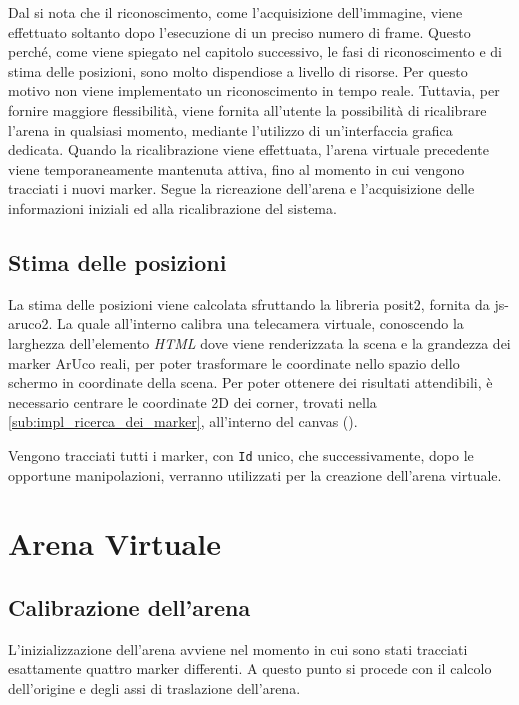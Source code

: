 \documentclass[12pt,a4paper,openright,oneside]{book}
\begin{document}
Dal  si nota che il riconoscimento, come l'acquisizione dell'immagine, viene effettuato soltanto dopo l'esecuzione di un preciso numero di frame. Questo perché, come viene spiegato nel capitolo successivo, le fasi di riconoscimento e di stima delle posizioni, sono molto dispendiose a livello di risorse. Per questo motivo non viene implementato un riconoscimento in tempo reale. Tuttavia, per fornire maggiore flessibilità, viene fornita all'utente la possibilità di ricalibrare l'arena in qualsiasi momento, mediante l'utilizzo di un'interfaccia grafica dedicata. Quando la ricalibrazione viene effettuata, l'arena virtuale precedente viene temporaneamente mantenuta attiva, fino al momento in cui vengono tracciati i nuovi marker. Segue la ricreazione dell'arena e l'acquisizione delle informazioni iniziali ed alla ricalibrazione del sistema.

\subsection{Stima delle posizioni}\label{sub:impl_stima_delle_posizioni} %
La stima delle posizioni viene calcolata sfruttando la libreria posit2, fornita da js-aruco2.
La quale all'interno calibra una telecamera virtuale, conoscendo la larghezza dell'elemento \textit{HTML} dove viene renderizzata la scena e la grandezza dei marker ArUco reali, per poter trasformare le coordinate nello spazio dello schermo in coordinate della scena.
Per poter ottenere dei risultati attendibili, è necessario centrare le coordinate 2D dei corner, trovati nella \cref{sub:impl_ricerca_dei_marker}, all'interno del canvas ().
%

Vengono tracciati tutti i marker, con \texttt{Id} unico, che successivamente, dopo le opportune manipolazioni, verranno utilizzati per la creazione dell'arena virtuale.
%


\section{Arena Virtuale}\label{sec:impl_arena_virtuale} %
%
\subsection{Calibrazione dell'arena}\label{sub:impl_calibrazione_dell_arena} %
L'inizializzazione dell'arena avviene nel momento in cui sono stati tracciati esattamente quattro marker differenti. A questo punto si procede con il calcolo dell'origine e degli assi di traslazione dell'arena.
\end{document}
